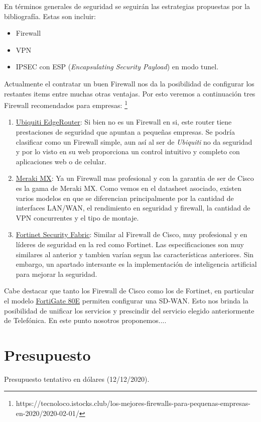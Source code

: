 \documentclass[11pt]{article}
\begin{document}
    En términos generales de seguridad se seguirán las estrategias propuestas por la bibliografía. Estas son incluir:
    \begin{itemize}
        \item Firewall
        \item VPN
        \item IPSEC con ESP (\textit{Encapsulating Security Payload}) en modo tunel.
    \end{itemize}

    Actualmente el contratar un buen Firewall nos da la posibilidad de configurar los restantes items entre muchas otras ventajas. Por esto veremos a continuación tres Firewall
    recomendados para empresas: \footnote{https://tecnoloco.istocks.club/los-mejores-firewalls-para-pequenas-empresas-en-2020/2020-02-01/}

    \begin{enumerate}
        \item  \href{https://www.ui.com/edgemax/edgerouter/}{Ubiquiti EdgeRouter}: Si bien no es un Firewall en si, este router tiene prestaciones de seguridad que apuntan a pequeñas
        empresas. Se podría clasificar como un Firewall simple, aun así al ser de \textit{Ubiquiti} no da seguridad y por lo visto en su web proporciona 
        un control intuitivo y completo con aplicaciones web o de celular.
        \item \href{https://meraki.cisco.com/lib/pdf/meraki_datasheet_mx_es.pdf}{Meraki MX}: Ya un Firewall mas profesional y con la garantia de ser de Cisco es la gama de Meraki MX.
        Como vemos en el datasheet asociado, existen varios modelos en que se diferencian principalmente por la cantidad de interfaces LAN/WAN, el rendimiento en seguridad y firewall, la
        cantidad de VPN concurrentes y el tipo de montaje. 
        \item \href{https://www.fortinet.com/content/dam/fortinet/assets/white-papers/wp-security-fabric.pdf}{Fortinet Security Fabric}: Similar al Firewall de Cisco, muy profesional y
        en líderes de seguridad en la red como Fortinet. Las especificaciones son muy similares al anterior y tambien varían segun las características anteriores. Sin embargo, un apartado 
        intersante es la implementación de inteligencia artificial para mejorar la seguridad.
    \end{enumerate}

    Cabe destacar que tanto los Firewall de Cisco como los de Fortinet, en particular el modelo 
    \href{https://www.fortinet.com/content/dam/fortinet/assets/data-sheets/FortiGate_80E_Series.pdf}{FortiGate 80E} permiten configurar una SD-WAN. Esto nos brinda la 
    posibilidad de unificar los servicios y prescindir del servicio elegido anteriormente de Telefónica. En este punto nosotros proponemos....

    \section{Presupuesto}

    \begin{table}[H]
        \centering
        
        \caption{Presupuesto tentativo en dólares (12/12/2020).}
    \end{table}

    
\end{document}
